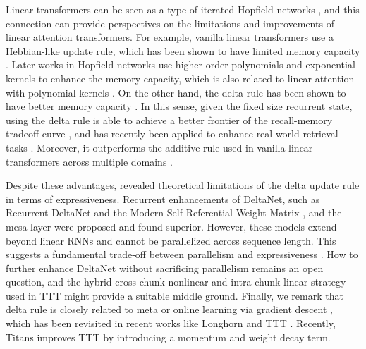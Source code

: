 Linear transformers can be seen as a  type of iterated Hopfield networks \cite{millidge_linear_nodate}, and this connection can provide  perspectives on the limitations and  improvements of linear attention transformers. For example, vanilla linear transformers use a Hebbian-like update rule, which has been shown to have limited memory capacity \cite{McEliece1987TheCO}. 
Later works in Hopfield networks use higher-order polynomials \cite{demircigil_model_2017} and exponential kernels \cite{ramsauer_hopfield_2021,krotov_large_2021} to enhance the memory capacity, which is also related to linear attention with polynomial kernels \cite{polysketch,arora_simple_2024,aksenov_linear_2024}.
On the other hand, the delta rule has been shown to have better memory capacity \cite{Gardner1988TheSO,Prados1989NeuralNC,Lingashetty2010DeltaLR,schlag_linear_2021}. In this sense, given the fixed size recurrent state, using the delta rule is able to achieve a better frontier of the recall-memory tradeoff curve \cite{arora_simple_2024}, and has recently been applied to enhance real-world retrieval tasks \cite{munkhdalai2024leave, Rodkin2024AssociativeRM}.
Moreover, it outperforms the additive rule used in vanilla linear transformers across multiple domains \cite{schlag_linear_2021, irie_going_2021, DBLP:conf/nips/IrieFS22, DBLP:conf/iclr/IrieS23, irie-etal-2023-practical}.

Despite these advantages, \citet{irie-etal-2023-practical} revealed theoretical limitations of the delta update rule in terms of expressiveness. Recurrent enhancements of DeltaNet, such as Recurrent DeltaNet \cite{irie2021going} and the Modern Self-Referential Weight Matrix \cite{Irie2022AMS}, and the mesa-layer \cite{mesa} were proposed and found superior.
However, these models extend beyond linear RNNs and cannot be parallelized across sequence length. This suggests a fundamental trade-off between parallelism and expressiveness \cite{merrill_illusion_2024}. How to further enhance DeltaNet without sacrificing parallelism remains an open question, and the hybrid cross-chunk nonlinear and intra-chunk linear strategy used in TTT \citep{sun-2024-learning} might provide a suitable middle ground. Finally, we remark that delta rule is closely related to meta or online learning via gradient descent \citep{munkhdalai_metalearned_2019, irie2022dual}, which has been revisited in recent works like Longhorn \citep{liu-2024-longhorn} and TTT \citep{sun-2024-learning}. Recently, Titans \citep{behrouz2024titanslearningmemorizetest} improves TTT by introducing a momentum and weight decay term.